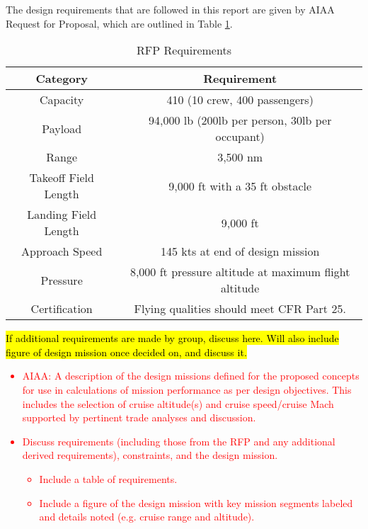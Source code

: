 The design requirements that are followed in this report are given by AIAA Request for Proposal, which are outlined in Table \ref{uno}.

\begin{table}[h!] 
    \centering
    \caption{RFP Requirements}
    \begin{tabular}{ |c||c| }\toprule
    \textbf{Category} & \textbf{Requirement} \\\hline\hline
    Capacity & 410 (10 crew, 400 passengers) \\\hline
    Payload & 94,000 lb (200lb per person, 30lb per occupant) \\\hline
    Range & 3,500 nm \\\hline
    Takeoff Field Length & 9,000 ft with a 35 ft obstacle \\\hline
    Landing Field Length & 9,000 ft \\\hline
    Approach Speed & 145 kts at end of design mission\\\hline
    Pressure & 8,000 ft pressure altitude at maximum flight altitude \\\hline
    Certification & Flying qualities should meet CFR Part 25.\\\hline 

    \end{tabular}\label{uno}
\end{table}

\hl{If additional requirements are made by group, discuss here. Will also include figure of design mission once decided on, and discuss it.}


\textcolor{red}{
\begin{itemize}
    \item AIAA: A description of the design missions defined for the proposed concepts for use in
calculations of mission performance as per design objectives. This includes the
selection of cruise altitude(s) and cruise speed/cruise Mach supported by pertinent
trade analyses and discussion.
    \item Discuss requirements (including those from the RFP and any additional derived requirements), constraints, and the design mission.
    \begin{itemize}
        \item Include a table of requirements.
        \item Include a figure of the design mission with key mission segments labeled and details noted (e.g. cruise range and altitude).
    \end{itemize}
\end{itemize}}